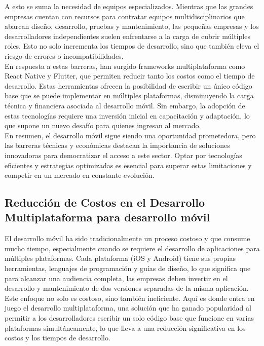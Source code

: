 A esto se suma la necesidad de equipos especializados. Mientras que las grandes empresas cuentan con
recursos para contratar equipos multidisciplinarios que abarcan diseño, desarrollo, pruebas y mantenimiento,
las pequeñas empresas y los desarrolladores independientes suelen enfrentarse a la carga de cubrir múltiples
roles. Esto no solo incrementa los tiempos de desarrollo, sino que también eleva el riesgo de errores
o incompatibilidades.\\

En respuesta a estas barreras, han surgido frameworks multiplataforma como React Native y Flutter, que
permiten reducir tanto los costos como el tiempo de desarrollo. Estas herramientas ofrecen la posibilidad
de escribir un único código base que se puede implementar en múltiples plataformas, disminuyendo la carga
técnica y financiera asociada al desarrollo móvil. Sin embargo, la adopción de estas tecnologías requiere
una inversión inicial en capacitación y adaptación, lo que supone un nuevo desafío para quienes ingresan al mercado.\\

En resumen, el desarrollo móvil sigue siendo una oportunidad prometedora, pero las barreras técnicas y
económicas destacan la importancia de soluciones innovadoras para democratizar el acceso a este sector.
Optar por tecnologías eficientes y estrategias optimizadas es esencial para superar estas limitaciones
y competir en un mercado en constante evolución.

\subsection{Reducción de Costos en el Desarrollo Multiplataforma para desarrollo móvil}
El desarrollo móvil ha sido tradicionalmente un proceso costoso y que consume mucho tiempo, especialmente
cuando se requiere el desarrollo de aplicaciones para múltiples plataformas. Cada plataforma (iOS y Android)
tiene sus propias herramientas, lenguajes de programación y guías de diseño, lo que significa que para
alcanzar una audiencia completa, las empresas deben invertir en el desarrollo y mantenimiento de dos versiones
separadas de la misma aplicación. Este enfoque no solo es costoso, sino también ineficiente. Aquí es
donde entra en juego el desarrollo multiplataforma, una solución que ha ganado popularidad al permitir
a los desarrolladores escribir un solo código base que funcione en varias plataformas simultáneamente,
lo que lleva a una reducción significativa en los costos y los tiempos de desarrollo.\\

